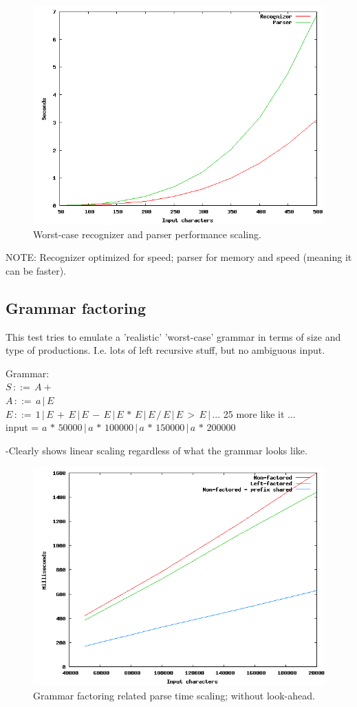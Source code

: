 \documentclass[a4paper,10pt]{article}
\begin{document}
\begin{figure}[H]
\centering
\includegraphics[scale=0.5]{worst-case.png}
\caption{Worst-case recognizer and parser performance scaling.}
\end{figure}

NOTE: Recognizer optimized for speed; parser for memory and speed (meaning it can be faster).

\subsection{Grammar factoring}

This test tries to emulate a 'realistic' 'worst-case' grammar in terms of size and type of productions. I.e. lots of left recursive stuff, but no ambiguous input.

Grammar:\\
$S\,::=\,A+$\\
$A\,::=\,a\,|\,E$\\
$E\,::=\,1\,|\,E\,+\,E\,|\,E\,-\,E\,|\,E\,*\,E\,|\,E\,/\,E\,|\,E\,>\,E\,|\,...$ 25 more like it ...\\
input = $a\,*\,50000\,|\,a\,*\,100000\,|\,a\,*\,150000\,|\,a\,*\,200000$

-Clearly shows linear scaling regardless of what the grammar looks like.

\begin{figure}[H]
\centering
\includegraphics[scale=0.5]{grammar-factoring.png}
\caption{Grammar factoring related parse time scaling; without look-ahead.}
\end{figure}
\end{document}
